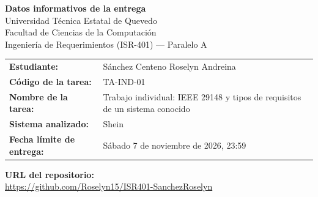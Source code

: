 ﻿\documentclass[12pt,a4paper]{article}
\begin{document}
\begin{center}
  {\Large\bfseries Datos informativos de la entrega}\\[10pt]
  {\large Universidad T\'ecnica Estatal de Quevedo}\\
  {\large Facultad de Ciencias de la Computaci\'on}\\
  {\large Ingenier\'ia de Requerimientos (ISR-401) --- Paralelo A}
\end{center}

\vspace{1.2cm}

\begin{tabular}{@{}l>{\raggedright\arraybackslash}p{8.6cm}@{}}
  \textbf{Estudiante:} & S\'anchez Centeno Roselyn Andreina \\[6pt]
  \textbf{C\'odigo de la tarea:} & TA-IND-01 \\[6pt]
  \textbf{Nombre de la tarea:} & Trabajo individual: IEEE 29148 y tipos de requisitos de un sistema conocido \\[6pt]
  \textbf{Sistema analizado:} & Shein \\[6pt]
  \textbf{Fecha l\'imite de entrega:} & S\'abado 7 de noviembre de 2026, 23:59 \\
\end{tabular}

\vspace{1.2cm}

\textbf{URL del repositorio:}\\[4pt]
\noindent\url{https://github.com/Roselyn15/ISR401-SanchezRoselyn}
\end{document}
